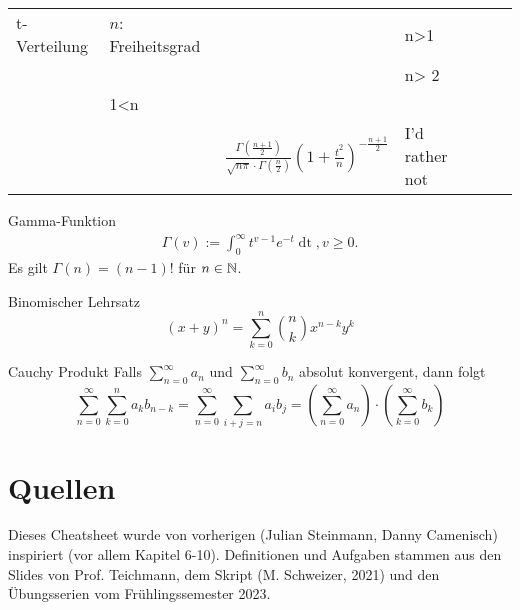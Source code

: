 \begin{center}
\begin{table*}
\begin{tabularx}{\textwidth}{llXXXX}
				t-Verteilung             & \( n \): Freiheitsgrad               & \( \begin{cases} 0 & n>1 \\ \text{undef.} & \text{sonst} \end{cases} \) & \( \begin{cases} \frac{n}{n-2} & n> 2 \\ \infty & 1<n \leq 2 \\ \text{undef.} & \text{sonst} \end{cases} \) & \( \frac{\Gamma \left( \frac{n+1}{2} \right) }{\sqrt{n\pi } \cdot \Gamma (\frac{n}{2})} \left( 1+ \frac{t^2}{n} \right) ^{- \frac{n+1}{2}} \) & I'd rather not                                \\
		
		
	
			\bottomrule
		\end{tabularx}

    \end{table*}
\end{center}

\vspace*{-1.1cm}
\begin{subbox}{Gamma-Funktion}
	\begin{align*}
		\Gamma(v) := \int_0^\infty t^{v-1}e^{-t}\mathop{dt}, v \geq 0.
	\end{align*}
	Es gilt $\Gamma(n) = (n-1)!$ für $n \in \mathbb{N}$.
\end{subbox}
\begin{subbox}{Binomischer Lehrsatz}
	\[(x + y)^n = \sum_{k = 0}^n  \binom{n}{k} x^{n-k}y^k\]
\end{subbox}
\break
\vspace*{12.5cm}
\begin{subbox}{Cauchy Produkt}
	Falls $\sum_{n= 0}^\infty a_n$ und $\sum_{n = 0}^\infty b_n$ absolut konvergent, dann folgt
	\[\sum_{n = 0}^\infty \sum_{k = 0}^n a_kb_{n-k} = \sum_{n = 0}^\infty \sum_{i+j = n} a_ib_j = \left(\sum_{n = 0}^\infty a_n\right) \cdot \left(\sum_{k = 0}^\infty b_k\right)\]
\end{subbox}
\section{Quellen}
Dieses Cheatsheet wurde von vorherigen (Julian Steinmann, Danny Camenisch) inspiriert (vor allem Kapitel 6-10). Definitionen und Aufgaben stammen aus den Slides von Prof. Teichmann, dem Skript (M. Schweizer, 2021) und den Übungsserien vom Frühlingssemester 2023.


